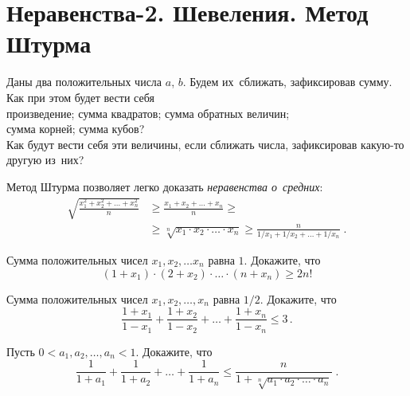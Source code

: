 

\section*{Неравенства-2. Шевеления. Метод Штурма}


\resetsubproblem
Даны два положительных числа $a$, $b$.
Будем их~сближать, зафиксировав сумму.
Как при этом будет вести себя
\\
\subproblem произведение;
\quad
\subproblem сумма квадратов;
\quad
\subproblem сумма обратных величин;
\\
\subproblem сумма корней;
\quad
\subproblem сумма кубов?
\\
Как будут вести себя эти величины, если сближать числа, зафиксировав какую-то
другую из~них?

Метод Штурма позволяет легко доказать \emph{неравенства о~средних}:
\begin{align*}
    \sqrt{\frac{x_1^2 + x_2^2 + \ldots +x_n^2}{n}}
& \geq
    \frac{x_1 + x_2 + \ldots + x_n}{n}
\geq \\ & \geq
    \sqrt[n]{x_1 \cdot x_2 \cdot \ldots \cdot x_n}
\geq
    \frac{n}{1 / x_1 + 1 / x_2 + \ldots + 1 / x_n}
\; . \end{align*}

\begin{problems}

\item
Сумма положительных чисел $x_1, x_2, \ldots x_n$ равна $1$.
Докажите, что
\[
    (1 + x_1) \cdot (2 + x_2) \cdot \ldots \cdot (n + x_n)
\geq
    2n!
\]

\item
Сумма положительных чисел $x_1, x_2, \ldots, x_n$ равна $1 / 2$.
Докажите, что
\[
    \frac{1 + x_1}{1 - x_1} +
    \frac{1 + x_2}{1 - x_2} +
    \ldots +
    \frac{1 + x_n}{1 - x_n}
\leq
    3
\, . \]

\item
Пусть $0 < a_1, a_2, \ldots, a_n < 1$.
Докажите, что
\[
    \frac{1}{1 + a_1} + \frac{1}{1 + a_2} +
    \ldots +
    \frac{1}{1 + a_n}
\leq
    \frac{n}{1 + \sqrt[n]{a_1 \cdot a_2 \cdot \ldots \cdot a_n}}
\; . \]

\end{problems}


